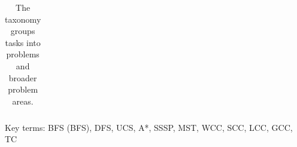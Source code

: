 \begin{landscape}
\begin{table}[t]
\begin{center}
{\begin{tabular}{lll}
                                                
            \end{tabular}
        \caption{The \gai taxonomy groups \gai tasks into \gai problems and broader \gai problem areas.} 
        \label{Table:taxonomy}
        }
        \end{center}
    \end{table}

    \noindent
    {\scriptsize 
    Key terms: 
    \acl{BFS} (\acs{BFS}), 
    \ac{DFS}, 
    \ac{UCS}, 
    \ac{A*}, 
    \ac{SSSP}, 
    \ac{MST}, 
    \ac{WCC}, 
    \ac{SCC}, 
    \ac{LCC}, 
    \ac{GCC}, 
    \ac{TC} }

\end{landscape}
